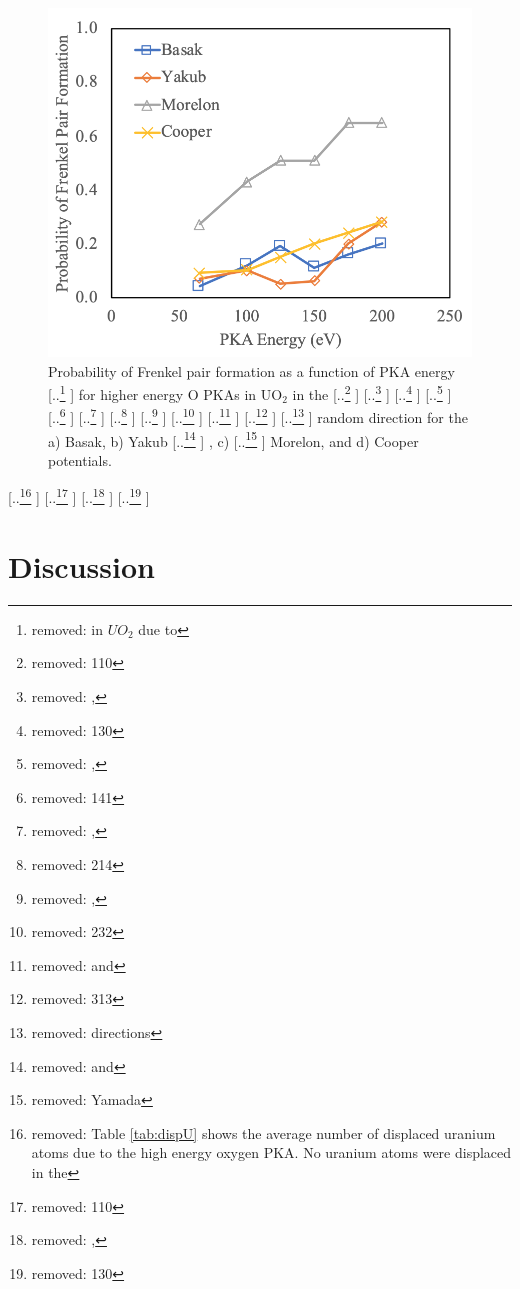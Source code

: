 \documentclass[review]{elsarticle} %
\providecommand{\DIFaddtex}[1]{{\protect\color{blue} \sf #1}} %
\providecommand{\DIFdeltex}[1]{{\protect\color{red} [..\footnote{removed: #1} ]}} %
\providecommand{\DIFaddbegin}{} %
\providecommand{\DIFdelbegin}{} %
\providecommand{\DIFdelend}{} %
\providecommand{\DIFaddFL}[1]{\DIFadd{#1}} %
\providecommand{\DIFdelFL}[1]{\DIFdel{#1}} %
\providecommand{\DIFaddbeginFL}{} %
\providecommand{\DIFaddendFL}{} %
\providecommand{\DIFdelbeginFL}{} %
\providecommand{\DIFdelendFL}{} %
\providecommand{\DIFadd}[1]{\texorpdfstring{\DIFaddtex{#1}}{#1}} %
\providecommand{\DIFdel}[1]{\texorpdfstring{\DIFdeltex{#1}}{}} %
\newcommand{\DIFscaledelfig}{0.5}
\newlength{\DIFdelgraphicswidth} %
\newlength{\DIFdelgraphicsheight} %
\newcommand{\DIFaddincludegraphics}[2][]{{\color{blue}\fbox{\DIFOincludegraphics[#1]{#2}}}} %
\newcommand{\DIFdelincludegraphics}[2][]{%
\sbox{\DIFdelgraphicsbox}{\DIFOincludegraphics[#1]{#2}}%
\settoboxwidth{\DIFdelgraphicswidth}{\DIFdelgraphicsbox} %
\settoboxtotalheight{\DIFdelgraphicsheight}{\DIFdelgraphicsbox} %
\scalebox{\DIFscaledelfig}{%
\parbox[b]{\DIFdelgraphicswidth}{\usebox{\DIFdelgraphicsbox}\\[-\baselineskip] \rule{\DIFdelgraphicswidth}{0em}}\llap{\resizebox{\DIFdelgraphicswidth}{\DIFdelgraphicsheight}{%
\setlength{\unitlength}{\DIFdelgraphicswidth}%
\begin{picture}(1,1)%
\thicklines\linethickness{2pt} %
{\color[rgb]{1,0,0}\put(0,0){\framebox(1,1){}}}%
{\color[rgb]{1,0,0}\put(0,0){\line( 1,1){1}}}%
{\color[rgb]{1,0,0}\put(0,1){\line(1,-1){1}}}%
\end{picture}%
}\hspace*{3pt}}} %
} %
\DeclareRobustCommand{\DIFaddbegin}{\DIFOaddbegin \let\includegraphics\DIFaddincludegraphics} %
\DeclareRobustCommand{\DIFdelbegin}{\DIFOdelbegin \let\includegraphics\DIFdelincludegraphics} %
\DeclareRobustCommand{\DIFdelend}{\DIFOaddend \let\includegraphics\DIFOincludegraphics} %
\DeclareRobustCommand{\DIFaddbeginFL}{\DIFOaddbeginFL \let\includegraphics\DIFaddincludegraphics} %
\DeclareRobustCommand{\DIFaddendFL}{\DIFOaddendFL \let\includegraphics\DIFOincludegraphics} %
\DeclareRobustCommand{\DIFdelbeginFL}{\DIFOdelbeginFL \let\includegraphics\DIFdelincludegraphics} %
\DeclareRobustCommand{\DIFdelendFL}{\DIFOaddendFL \let\includegraphics\DIFOincludegraphics} %
\begin{document}
\begin{figure}[h]
 \centering
 \includegraphics[width=1.0\textwidth]{FP_OE.png}
 \caption{Probability of Frenkel pair formation as a function of PKA energy \DIFdelbeginFL \DIFdelFL{in $UO_2$ due to }\DIFdelendFL \DIFaddbeginFL \DIFaddFL{for higher energy }\DIFaddendFL O PKAs in \DIFaddbeginFL \DIFaddFL{UO$_2$ in }\DIFaddendFL the \DIFdelbeginFL %
\DIFdelFL{110}%
\DIFdelFL{, }%
\DIFdelFL{130}%
\DIFdelFL{, }%
\DIFdelFL{141}%
\DIFdelFL{, }%
\DIFdelFL{214}%
\DIFdelFL{, }%
\DIFdelFL{232}%
\DIFdelFL{and }%
\DIFdelFL{313}%
\DIFdelFL{directions }\DIFdelendFL \DIFaddbeginFL \DIFaddFL{random direction }\DIFaddendFL for the a) Basak, b) Yakub\DIFdelbeginFL \DIFdelFL{and }\DIFdelendFL \DIFaddbeginFL \DIFaddFL{, }\DIFaddendFL c) \DIFdelbeginFL \DIFdelFL{Yamada }\DIFdelendFL \DIFaddbeginFL \DIFaddFL{Morelon, and d) Cooper }\DIFaddendFL potentials.}
 \label{fig:fpoe}
\end{figure}

\DIFdelbegin \DIFdel{Table \ref{tab:dispU} shows the average number of displaced uranium atoms due to the high energy oxygen PKA. No uranium atoms were displaced in the  }%
\DIFdel{110}%
\DIFdel{, }%
\DIFdel{130}\DIFdelend \DIFaddbegin \FloatBarrier

\section{\DIFadd{Discussion}}
\end{document}
